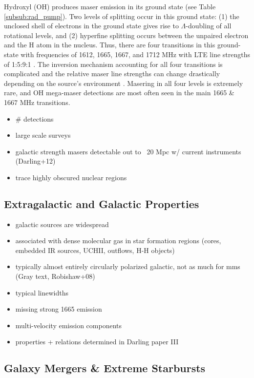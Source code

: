 
Hydroxyl (OH) produces maser emission in its ground state (see Table \ref{subsub:rad_pump}). Two levels of splitting occur in this ground state: (1) the unclosed shell of electrons in the ground state gives rise to $\Lambda$-doubling of all rotational levels, and (2) hyperfine splitting occurs between the unpaired electron and the H atom in the nucleus. Thus, there are four transitions in this ground-state with frequencies of 1612, 1665, 1667, and 1712 MHz with LTE line strengths of 1:5:9:1 \cite{lo2005}. The inversion mechanism accounting for all four transitions is complicated \citep{Elitzur_1992} and the relative maser line strengths can change drastically depending on the source's environment \citep{lo2005}. Masering in all four levels is extremely rare, and OH mega-maser detections are most often seen in the main 1665 \& 1667 MHz transitions. 

\begin{itemize}
\item # detections
\item large scale surveys
\item galactic strength masers detectable out to ~20 Mpc w/ current instruments (Darling+12) 
\item trace highly obscured nuclear regions
\end{itemize}


\subsection{Extragalactic and Galactic Properties}
\label{sub:oh_gal_props}

\begin{itemize}
\item galactic sources are widespread
\item associated with dense molecular gas in star formation regions (cores, embedded IR sources, UCHII, outflows, H-H objects)
\item typically almost entirely circularly polarized galactic, not as much for mms (Gray text, Robishaw+08) 
\item typical linewidths 
\item missing strong 1665 emission
\item multi-velocity emission components
\item properties + relations determined in Darling paper III
\end{itemize}

\subsection{Galaxy Mergers \& Extreme Starbursts}

